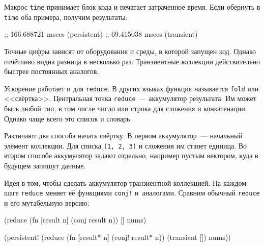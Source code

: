 Макрос \verb|time| принимает блок кода и печатает затраченное время. Если
обернуть в \verb|time| оба примера, получим результаты:

\begin{english}
  \begin{text}
;; 166.688721 msecs (persistent)
;;  69.415038 msecs (transient)
  \end{text}
\end{english}

Точные цифры зависят от оборудования и среды, в которой запущен код. Однако
отчётливо видна разница в несколько раз. Транзиентные коллекции действительно
быстрее постоянных аналогов.


Ускорение работает и для \verb|reduce|. В других языках функция называется
\verb|fold| или <<свёртка>>. Центральная точка \verb|reduce|~---
аккумулятор результата. Им может быть любой тип, в том числе число или строка
для сложения и конкатенации. Однако чаще всего это список и словарь.

Различают два способа начать свёртку. В первом аккумулятор~--- начальный элемент
коллекции. Для списка \verb|(1, 2, 3)| и сложения им станет единица. Во втором
способе аккумулятор задают отдельно, например пустым вектором, куда в будущем
запишут данные.

Идея в том, чтобы сделать аккумулятор транзиентной коллекцией. На каждом шаге
\verb|reduce| меняет её функциями \verb|conj!| и~аналогами. Сравним
обычный \verb|reduce| и его мутабельную версию:

\ifnarrow

\begin{english}

  \begin{clojure}
(reduce
 (fn [result n]
   (conj result n))
 []
 nums)
  \end{clojure}

\splitter

  \begin{clojure}
(persistent!
 (reduce
  (fn [result* n]
    (conj! result* n))
  (transient [])
  nums))
  \end{clojure}

\end{english}

\else

